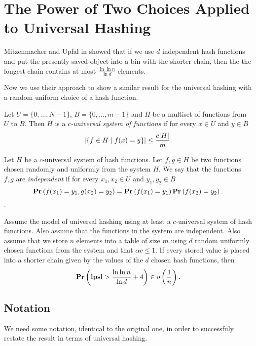 \section{The Power of Two Choices Applied to Universal Hashing}

Mitzenmacher and Upfal in \cite{1076315} showed that if we use $d$ independent hash functions and put the presently saved object into a bin with the shorter chain, then the the longest chain contains at most $\frac{\ln \ln n}{\ln d}$ elements.

Now we use their approach to show a similar result for the universal hashing with a random uniform choice of a hash function.

\begin{definition}
\label{definition-c-universal-system}
Let $U = \lbrace 0, \dots, N - 1 \rbrace$, $B = \lbrace 0, \dots, m - 1 \rbrace$ and $H$ be a multiset of functions from $U$ to $B$. Then $H$ is a \emph{$c$-universal system of functions} if for every $x \in U$ and $y \in B$ 
\[
\left|\lbrace f \in H \mid f(x) = y \rbrace\right| \leq \frac{c |H|}{m} \textit{.}
\]
\end{definition}

\begin{definition}
\label{definition-independent-hash-functions}
Let $H$ be a $c$-universal system of hash functions. Let $f, g \in H$ be two functions chosen randomly and uniformly from the system $H$. We say that the functions $f, g$ are \emph{independent} if for every $x_1, x_2 \in U$ and $y_1, y_2 \in B$ $$\mathbf{Pr}\left(f(x_1) = y_1, g(x_2\right) = y_2) = \mathbf{Pr}\left(f(x_1) = y_1\right) \mathbf{Pr}\left(f(x_2) = y_2\right) \textit{.}$$.
\end{definition}

\begin{theorem}
\label{theorem-universal-hashing-two-choices}
Assume the model of universal hashing using at least a $c$-universal system of hash functions. Also assume that the functions in the system are independent. Also assume that we store $n$ elements into a table of size $m$ using $d$ random uniformly chosen functions from the system and that $\alpha c \leq 1$. If every stored value is placed into a shorter chain given by the values of the $d$ chosen hash functions, then $$\mathbf{Pr}\left(\mathbf{lpsl} > \frac{\ln \ln n}{\ln d} + 4\right) \in o\left(\frac{1}{n}\right) \textit{.}$$
\end{theorem}

\subsection{Notation}
We need some notation, identical to the original one, in order to successfuly restate the result in terms of universal hashing.

